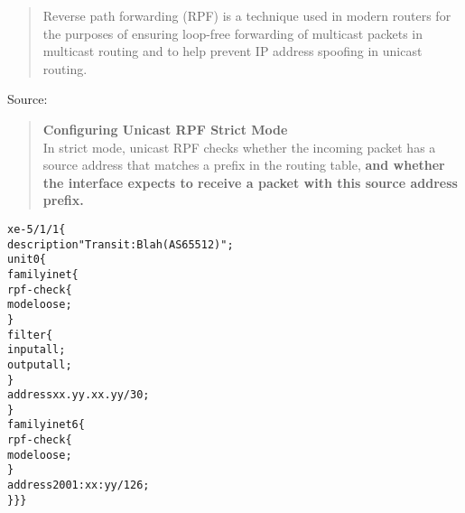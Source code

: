 \documentclass[Screen16to9,17pt]{foils}
\begin{document}

\begin{quote}
Reverse path forwarding (RPF) is a technique used in modern routers for the purposes of ensuring loop-free forwarding of multicast packets in multicast routing and to help prevent IP address spoofing in unicast routing.
\end{quote}
Source: 









\begin{quote}
{\bf Configuring Unicast RPF Strict Mode}\\
In strict mode, unicast RPF checks whether the incoming packet has a source address that matches a prefix in the routing table, {\bf and whether the interface expects to receive a packet with this source address prefix.}
\end{quote}



\begin{alltt}\footnotesize
xe-5/1/1 \{
    description "Transit: Blah (AS65512)";
    unit 0 \{
        family inet \{
            rpf-check \{
                mode loose;
            \}
            filter \{
                input all;
                output all;
            \}
            address xx.yy.xx.yy/30;
        \}
        family inet6 \{
            rpf-check \{
                mode loose;
            \}
            address 2001:xx:yy/126;
\} \} \}
\end{alltt}
\end{document}
